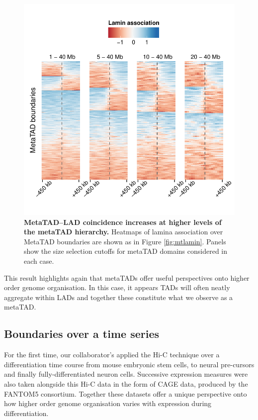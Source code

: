 \documentclass[a4paper,11pt,oneside]{book}
\begin{document}
\begin{figure}
\begin{center} 
\includegraphics[width=5in]{mt_cutoffrange.pdf}
\captionsetup{width=\textwidth}
\caption[ MetaTAD--LAD coincidence increases at higher levels of the metaTAD hierarchy. ]{ {\bf MetaTAD--LAD coincidence increases at higher levels of the metaTAD hierarchy. }
Heatmaps of lamina association over MetaTAD boundaries are shown as in Figure \ref{fig:mtlamin}. Panels show the size selection cutoffs for metaTAD domains considered in each case.
}\label{fig:mtcutoffrange}
\end{center}
\end{figure} 

This result highlights again that metaTADs offer useful perspectives onto higher order genome organisation. In this case, it appears TADs will often neatly aggregate within LADs and together these constitute what we observe as a metaTAD.

\subsection{Boundaries over a time series}

For the first time, our collaborator's applied the Hi-C technique over a differentiation time course from mouse embryonic stem cells, to neural pre-cursors and finally fully-differentiated neuron cells. Successive expression measures were also taken alongside this Hi-C data in the form of CAGE data, produced by the FANTOM5 consortium.\cite{fantom5} Together these datasets offer a unique perspective onto how higher order genome organisation varies with expression during differentiation. 
\end{document}
